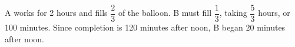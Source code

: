 A works for 2 hours and fills $\dfrac{2}{3}$ of the balloon. B must fill $\dfrac{1}{3}$, taking $\dfrac{5}{3}$ hours, or 100 minutes. Since completion is 120 minutes after noon, B began $\boxed{20}$ minutes after noon.
